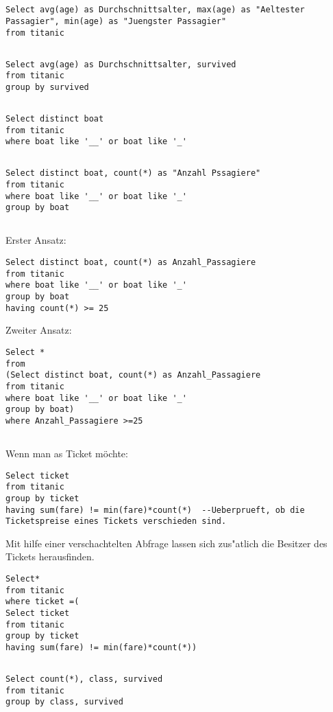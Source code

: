 \documentclass[a4paper, 11pt, titlepage]{article}
\begin{document}
\subsection{}
\begin{lstlisting}[style = sql]
Select avg(age) as Durchschnittsalter, max(age) as "Aeltester Passagier", min(age) as "Juengster Passagier"
from titanic
\end{lstlisting}
\subsection{}
\begin{lstlisting}[style = sql]
Select avg(age) as Durchschnittsalter, survived
from titanic
group by survived
\end{lstlisting}
\subsection{}
\begin{lstlisting}[style = sql]
Select distinct boat
from titanic
where boat like '__' or boat like '_'
\end{lstlisting}
\subsection{}
\begin{lstlisting}[style = sql]
Select distinct boat, count(*) as "Anzahl Pssagiere"
from titanic
where boat like '__' or boat like '_'
group by boat
\end{lstlisting}
\subsection{}
Erster Ansatz:
\begin{lstlisting}[style = sql]
Select distinct boat, count(*) as Anzahl_Passagiere
from titanic
where boat like '__' or boat like '_'
group by boat
having count(*) >= 25
\end{lstlisting}
Zweiter Ansatz:
\begin{lstlisting}[style = sql]
Select *
from 
(Select distinct boat, count(*) as Anzahl_Passagiere
from titanic
where boat like '__' or boat like '_'
group by boat) 
where Anzahl_Passagiere >=25
\end{lstlisting}
\subsection{}
Wenn man as Ticket möchte: 
\begin{lstlisting}[style = sql]
Select ticket
from titanic
group by ticket
having sum(fare) != min(fare)*count(*)  --Ueberprueft, ob die Ticketspreise eines Tickets verschieden sind.
\end{lstlisting}
Mit hilfe einer verschachtelten Abfrage lassen sich zus"atlich die Besitzer des Tickets herausfinden.
\begin{lstlisting}[style = sql]
Select*
from titanic
where ticket =(
Select ticket
from titanic
group by ticket
having sum(fare) != min(fare)*count(*))
\end{lstlisting}
\subsection{}
\begin{lstlisting}[style = sql]
Select count(*), class, survived
from titanic
group by class, survived
\end{lstlisting}
\end{document}
